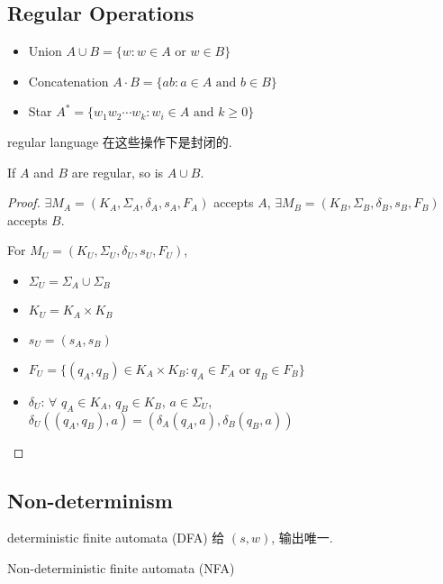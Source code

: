 \subsection{Regular Operations}
\begin{definition}\quad

    \begin{itemize}
        \item Union $A\cup B=\{ w: w\in A \text{ or }w \in B \}$
        \item Concatenation $A\cdot B=\{ ab: a\in A\text{ and }b \in B \}$
        \item Star $A^*=\{ w_1 w_2\cdots w_k :w_i \in A\text{ and }k\ge 0 \}$
    \end{itemize}
\end{definition}

regular language 在这些操作下是封闭的. 

\begin{theorem}
    If $A$ and $B$ are regular, so is $A\cup B$. 
\end{theorem}
\begin{proof}
    $\exists M_A=(K_A, \Sigma_A, \delta_A, s_A, F_A)$ accepts $A$, $\exists M_B=(K_B, \Sigma_B, \delta_B, s_B, F_B)$ accepts $B$.
    
    For $M_U=(K_U, \Sigma_U, \delta_U, s_U, F_U)$, 
    \begin{itemize}
        \item $\Sigma_U=\Sigma_A \cup \Sigma_B$
        \item $K_U=K_A\times K_B$
        \item $s_U=(s_A, s_B)$
        \item $F_U=\{ (q_A, q_B) \in K_A\times K_B:q_A\in F_A\text{ or }q_B\in F_B \}$
        \item $\delta_U$: $\forall$ $q_A\in K_A$, $q_B\in K_B$, $a\in \Sigma_U$, $\delta_U((q_A, q_B), a)=(\delta_A(q_A,a), \delta_B(q_B, a))$
    \end{itemize}
\end{proof}

\subsection{Non-determinism}
deterministic finite automata (DFA) 给 $(s,w)$, 输出唯一. 

Non-deterministic finite automata (NFA)



